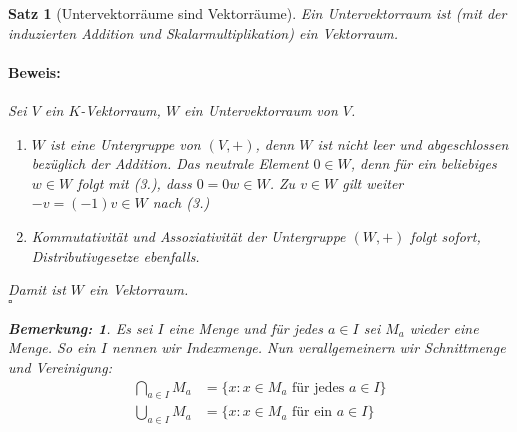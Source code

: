 \documentclass{report}
\theoremstyle{customrem}
\newtheorem*{bem}{Bemerkung\textnormal:}
\theoremstyle{customdef}
\newtheorem{satz}[definition]{Satz}
\renewenvironment{proof}{\vspace{-.75cm}\paragraph{Beweis: }}{\vspace{-.5cm}\hfill$\square$}
\begin{document}
	\begin{satz}[Untervektorräume sind Vektorräume]
		Ein Untervektorraum ist (mit der induzierten Addition und Skalarmultiplikation) ein Vektorraum.\\
		
		\begin{proof}
			Sei $V$ ein $K$-Vektorraum, $W$ ein Untervektorraum von $V$.
			\begin{enumerate}
				\item $W$ ist eine Untergruppe von $(V, +)$, denn $W$ ist nicht leer und abgeschlossen bezüglich der Addition. Das neutrale Element $0 \in W$, denn für ein beliebiges $w \in W$ folgt mit (3.), dass $0 = 0w \in W$. Zu $v \in W$ gilt weiter $-v = (-1)v \in W$ nach (3.)
				\item Kommutativität und Assoziativität der Untergruppe $(W, +)$ folgt sofort, Distributivgesetze ebenfalls.
			\end{enumerate}
			Damit ist $W$ ein Vektorraum.\\
		\end{proof}
		\vspace{.3cm}
		\begin{bem}
			Es sei $I$ eine Menge und für jedes $a \in I$ sei $M_a$ wieder eine Menge. So ein $I$ nennen wir Indexmenge. Nun verallgemeinern wir Schnittmenge und Vereinigung:
			\begin{align*}
				\bigcap_{a\in I} M_a &= \{x : x \in M_a \text{ für jedes\ } a \in I\}\\
				\bigcup_{a\in I} M_a &= \{x : x \in M_a \text{ für ein\ } a \in I\}
			\end{align*}
		\end{bem}
	\end{satz}
	
\end{document}
